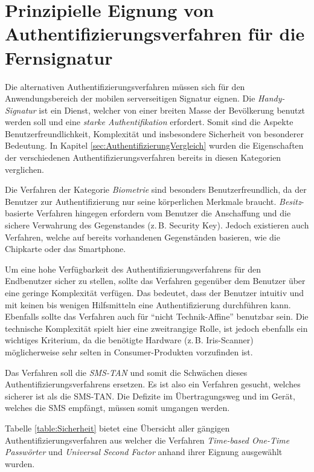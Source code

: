 \documentclass[11pt,a4paper,ngerman]{scrreprt}
\begin{document}
\section{Prinzipielle Eignung von Authentifizierungsverfahren für die Fernsignatur}\label{sec:eignung}
Die alternativen Authentifizierungsverfahren müssen sich für den Anwendungsbereich der mobilen serverseitigen Signatur eignen. Die \textit{Handy-Signatur} ist ein Dienst, welcher von einer breiten Masse der Bevölkerung benutzt werden soll und eine \emph{starke Authentifikation} erfordert. Somit sind die Aspekte Benutzerfreundlichkeit, Komplexität und insbesondere Sicherheit von besonderer Bedeutung. In Kapitel \ref{sec:AuthentifizierungVergleich} wurden die Eigenschaften der verschiedenen Authentifizierungsverfahren bereits in diesen Kategorien verglichen.
\begin{description}[font=\rmfamily]
    \item[Benutzerfreundlichkeit] Die Verfahren der Kategorie \emph{Biometrie} sind besonders Benutzerfreundlich, da der Benutzer zur Authentifizierung nur seine körperlichen Merkmale braucht. \emph{Besitz}-basierte Verfahren hingegen erfordern vom Benutzer die Anschaffung und die sichere Verwahrung des Gegenstandes (z.\,B. Security Key). Jedoch existieren auch Verfahren, welche auf bereits vorhandenen Gegenständen basieren, wie die Chipkarte oder das Smartphone.
    \item[Komplexität] Um eine hohe Verfügbarkeit des Authentifizierungsverfahrens für den Endbenutzer sicher zu stellen, sollte das Verfahren gegenüber dem Benutzer über eine geringe Komplexität verfügen. Das bedeutet, dass der Benutzer intuitiv und mit keinen bis wenigen Hilfsmitteln eine Authentifizierung durchführen kann. Ebenfalls sollte das Verfahren auch für ``nicht Technik-Affine'' benutzbar sein. Die technische Komplexität spielt hier eine zweitrangige Rolle, ist jedoch ebenfalls ein wichtiges Kriterium, da die benötigte Hardware (z.\,B. Iris-Scanner) möglicherweise sehr selten in Consumer-Produkten vorzufinden ist.
    \item[Sicherheit] Das Verfahren soll die \textit{SMS-TAN} und somit die Schwächen dieses Authentifizierungsverfahrens ersetzen. Es ist also ein Verfahren gesucht, welches sicherer ist als die SMS-TAN. Die Defizite im Übertragungsweg und im Gerät, welches die SMS empfängt, müssen somit umgangen werden.
\end{description}
Tabelle \ref{table:Sicherheit} bietet eine Übersicht aller gängigen Authentifizierungsverfahren aus welcher die Verfahren \textit{Time-based One-Time Passwörter} und \textit{Universal Second Factor} anhand ihrer Eignung ausgewählt wurden.
\end{document}
